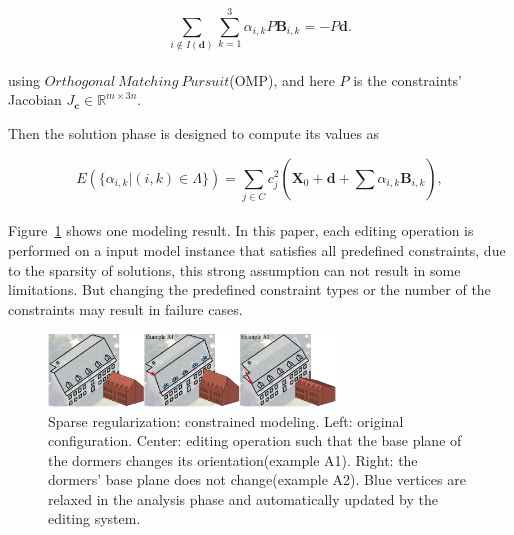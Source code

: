 \small{
\begin{equation}
 \label{eq:ConstrainedModeling2}
 \sum_{i\notin I(\mathbf{d})}^{}\sum_{k=1}^{3}\alpha_{i,k}P\mathbf{B}_{i,k}=-P\mathbf{d}.
\end{equation}
}
\\
using $Orthogonal~Matching~Pursuit$(OMP)\cite{tropp2007signal},
and here $P$ is the constraints' Jacobian $J_{\mathbf{c}}\in \mathbb{R}^{m\times 3n}$.

Then the solution phase is designed to compute its values as

\small{
\begin{equation}
 \label{eq:ConstrainedModeling3}
 E(\{\alpha_{i,k}|(i,k)\in \Lambda\})=\sum_{j\in C}^{}c{_j^2}(\mathbf{X}_0+\mathbf{d}+\sum_{}^{}\alpha_{i,k}\mathbf{B}_{i,k}),
\end{equation}
}
\\
Figure~\ref{fig:constraint modeling} shows one modeling result. In this paper, each editing operation is performed on a input model instance that satisfies all predefined constraints, due to the sparsity of solutions, this strong assumption can not result in some limitations. But changing the predefined constraint types or the number of the constraints may result in failure cases.

\begin{figure}[ht]
  \centering
  \includegraphics[width=3in]{images/modeling_L0}
  \caption{Sparse regularization: constrained modeling\cite{habbecke2012linear}. Left: original configuration. Center: editing operation such that the base plane of the dormers changes its orientation(example A1). Right: the dormers' base plane does not change(example A2). Blue vertices are relaxed in the analysis phase and automatically updated by the editing system.}
  \label{fig:constraint modeling}
\end{figure}


